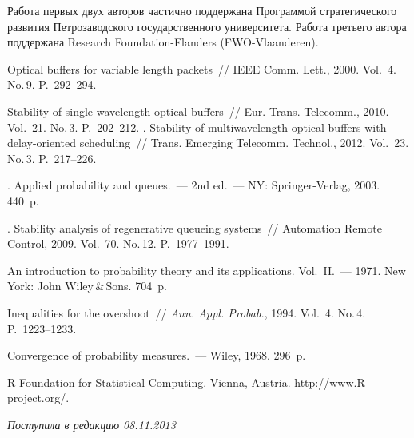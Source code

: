 



Работа первых двух авторов частично поддержана Программой стратегического развития Петрозаводского
государственного университета.
Работа третьего автора поддержана
Research Foundation-Flanders
(FWO-Vlaanderen).


 \begin{multicols}{2}

\renewcommand{\bibname}{\protect\rmfamily Литература}

{\small\frenchspacing
{%
\begin{thebibliography}{9}

Optical buffers for variable
length packets~// {IEEE Comm. Lett.}, 2000.
Vol.~4. No.\,9. P.~292--294.

Stability of single-wavelength optical buffers~//
{Eur. Trans. Telecomm.}, 2010. Vol.~21. No.\,3. P.~202--212.
. 
Stability of multiwavelength optical buffers with delay-oriented scheduling~//
{Trans. Emerging Telecomm. Technol.}, 2012. 
Vol.~23. No.\,3. P.~217--226.

.  {Applied probability and queues}.~--- 2nd
ed.~---  NY: Springer-Verlag, 2003. 440~p.


. 
Stability analysis of regenerative
queueing  systems~// Automation Remote Control, 2009. Vol.~70. No.\,12.
P.~1977--1991.

{An introduction to probability theory and its applications}. Vol.~II.~--- 1971.
New York: John Wiley\,\&\,Sons. 704~p.


 Inequalities for the overshoot~// \textit{Ann. 
Appl. Probab.}, 1994.  Vol.~4. No.\,4. P.~1223--1233.

{Convergence of probability measures}.~--- Wiley, 1968. 296~p.

{R Foundation for Statistical Computing}.
  Vienna, Austria. {\sf http://www.R-project.org/}.

\end{thebibliography}
} }

\end{multicols}

 \label{end\stat}

\hfill{\small\textit{Поступила в редакцию 08.11.2013}}
\renewcommand{\figurename}{\protect\bf Рис.}